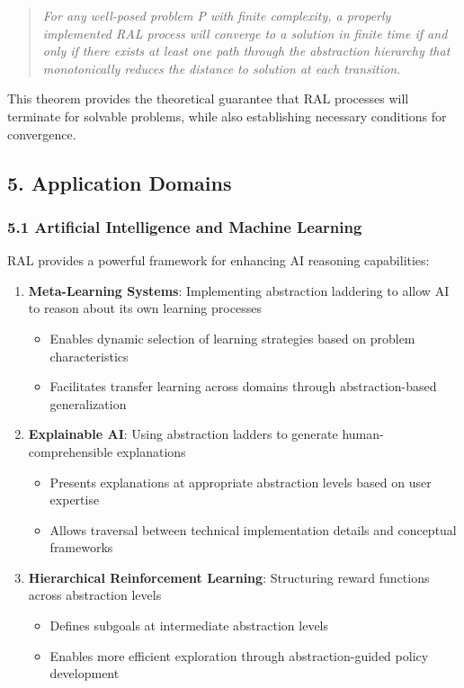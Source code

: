 \documentclass[
]{article}
\providecommand{\tightlist}{%
  \setlength{\itemsep}{0pt}\setlength{\parskip}{0pt}}
\begin{document}
\begin{quote}
\emph{For any well-posed problem P with finite complexity, a properly
implemented RAL process will converge to a solution in finite time if
and only if there exists at least one path through the abstraction
hierarchy that monotonically reduces the distance to solution at each
transition.}
\end{quote}

This theorem provides the theoretical guarantee that RAL processes will
terminate for solvable problems, while also establishing necessary
conditions for convergence.

\subsection{5. Application Domains}\label{application-domains-2}

\subsubsection{5.1 Artificial Intelligence and Machine
Learning}\label{artificial-intelligence-and-machine-learning}

RAL provides a powerful framework for enhancing AI reasoning
capabilities:

\begin{enumerate}
\def\labelenumi{\arabic{enumi}.}
\tightlist
\item
  \textbf{Meta-Learning Systems}: Implementing abstraction laddering to
  allow AI to reason about its own learning processes

  \begin{itemize}
  \tightlist
  \item
    Enables dynamic selection of learning strategies based on problem
    characteristics
  \item
    Facilitates transfer learning across domains through
    abstraction-based generalization
  \end{itemize}
\item
  \textbf{Explainable AI}: Using abstraction ladders to generate
  human-comprehensible explanations

  \begin{itemize}
  \tightlist
  \item
    Presents explanations at appropriate abstraction levels based on
    user expertise
  \item
    Allows traversal between technical implementation details and
    conceptual frameworks
  \end{itemize}
\item
  \textbf{Hierarchical Reinforcement Learning}: Structuring reward
  functions across abstraction levels

  \begin{itemize}
  \tightlist
  \item
    Defines subgoals at intermediate abstraction levels
  \item
    Enables more efficient exploration through abstraction-guided policy
    development
  \end{itemize}
\end{enumerate}
\end{document}
